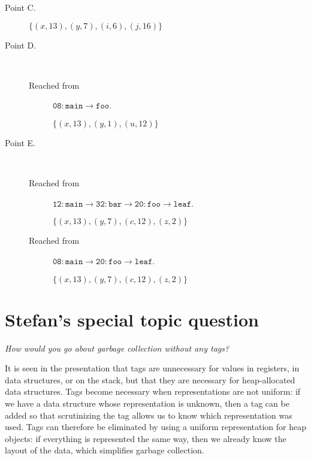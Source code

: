 \documentclass[letterpaper,11pt]{article}
\newcommand{\f}{\mathtt}
\begin{document}
\begin{description}
\begin{description}
      \item[Point C.]
        $\{ (x, 13), (y, 7), (i, 6), (j, 16) \}$

      \item[Point D.] ~

        \begin{description}
          \item[Reached from] $\f{08:main}\to\f{foo}$.

            $\{ (x, 13), (y, 1), (u, 12) \}$
        \end{description}

      \item[Point E.] ~

        \begin{description}
          \item[Reached from]
            $\f{12:main}\to\f{32:bar}\to\f{20:foo}\to\f{leaf}$.

            $\{ (x, 13), (y, 7), (c, 12), (z, 2) \}$

          \item[Reached from]
            $\f{08:main}\to\f{20:foo}\to\f{leaf}$.

            $\{ (x, 13), (y, 7), (c, 12), (z, 2) \}$
        \end{description}

    \end{description}

\end{description}

\section{Stefan's special topic question}

\begin{displayquote}
  \emph{How would you go about garbage collection without any tags?}
\end{displayquote}

It is seen in the presentation that tags are unnecessary for values in
registers, in data structures, or on the stack, but that they are necessary for
heap-allocated data structures. Tags become necessary when representations are
not uniform: if we have a data structure whose representation is unknown, then
a tag can be added so that scrutinizing the tag allows us to know which
representation was used. Tags can therefore be eliminated by using a uniform
representation for heap objects: if everything is represented the same way,
then we already know the layout of the data, which simplifies garbage
collection.
\end{document}
